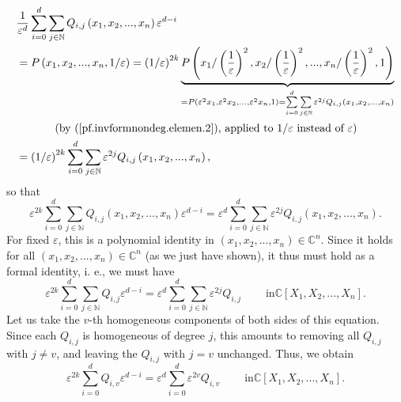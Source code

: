 \documentclass[etingof-lie.tex]{subfiles}
\begin{document}
\begin{align*}
&  \dfrac{1}{\varepsilon^{d}}\sum\limits_{i=0}^{d}\sum\limits_{j\in\mathbb{N}%
}Q_{i,j}\left(  x_{1},x_{2},...,x_{n}\right)  \varepsilon^{d-i}\\
&  =P\left(  x_{1},x_{2},...,x_{n},1/\varepsilon\right)  =\left(
1/\varepsilon\right)  ^{2k}\underbrace{P\left(  x_{1}/\left(  \dfrac
{1}{\varepsilon}\right)  ^{2},x_{2}/\left(  \dfrac{1}{\varepsilon}\right)
^{2},...,x_{n}/\left(  \dfrac{1}{\varepsilon}\right)  ^{2},1\right)
}_{=P\left(  \varepsilon^{2}x_{1},\varepsilon^{2}x_{2},...,\varepsilon
^{2}x_{n},1\right)  =\sum\limits_{i=0}^{d}\sum\limits_{j\in\mathbb{N}%
}\varepsilon^{2j}Q_{i,j}\left(  x_{1},x_{2},...,x_{n}\right)  }\\
&  \ \ \ \ \ \ \ \ \ \ \left(  \text{by (\ref{pf.invformnondeg.elemen.2}),
applied to }1/\varepsilon\text{ instead of }\varepsilon\right) \\
&  =\left(  1/\varepsilon\right)  ^{2k}\sum\limits_{i=0}^{d}\sum
\limits_{j\in\mathbb{N}}\varepsilon^{2j}Q_{i,j}\left(  x_{1},x_{2}%
,...,x_{n}\right)  ,
\end{align*}
so that%
\[
\varepsilon^{2k}\sum\limits_{i=0}^{d}\sum\limits_{j\in\mathbb{N}}%
Q_{i,j}\left(  x_{1},x_{2},...,x_{n}\right)  \varepsilon^{d-i}=\varepsilon
^{d}\sum\limits_{i=0}^{d}\sum\limits_{j\in\mathbb{N}}\varepsilon^{2j}%
Q_{i,j}\left(  x_{1},x_{2},...,x_{n}\right)  .
\]
For fixed $\varepsilon$, this is a polynomial identity in $\left(  x_{1}%
,x_{2},...,x_{n}\right)  \in\mathbb{C}^{n}$. Since it holds for all $\left(
x_{1},x_{2},...,x_{n}\right)  \in\mathbb{C}^{n}$ (as we just have shown), it
thus must hold as a formal identity, i. e., we must have%
\[
\varepsilon^{2k}\sum\limits_{i=0}^{d}\sum\limits_{j\in\mathbb{N}}%
Q_{i,j}\varepsilon^{d-i}=\varepsilon^{d}\sum\limits_{i=0}^{d}\sum
\limits_{j\in\mathbb{N}}\varepsilon^{2j}Q_{i,j}\ \ \ \ \ \ \ \ \ \ \text{in
}\mathbb{C}\left[  X_{1},X_{2},...,X_{n}\right]  .
\]
Let us take the $v$-th homogeneous components of both sides of this equation.
Since each $Q_{i,j}$ is homogeneous of degree $j$, this amounts to removing
all $Q_{i,j}$ with $j\neq v$, and leaving the $Q_{i,j}$ with $j=v$ unchanged.
Thus, we obtain%
\begin{equation}
\varepsilon^{2k}\sum\limits_{i=0}^{d}Q_{i,v}\varepsilon^{d-i}=\varepsilon
^{d}\sum\limits_{i=0}^{d}\varepsilon^{2v}Q_{i,v}\ \ \ \ \ \ \ \ \ \ \text{in
}\mathbb{C}\left[  X_{1},X_{2},...,X_{n}\right]  .
\label{pf.invformnondeg.elemen.6}%
\end{equation}
\end{document}
